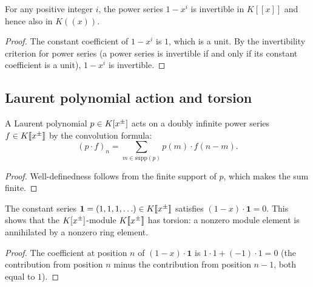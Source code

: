 \begin{lemma}
\label{lem.fps.laure.one-sub-xpow-unit}
\leanhelper
\leanok
For any positive integer $i$, the power series $1 - x^i$ is invertible
in $K\left[\left[x\right]\right]$ and hence also in
$K\left(\left(x\right)\right)$.
\end{lemma}

\begin{proof}
\leanok
The constant coefficient of $1 - x^i$ is $1$, which is a unit.
By the invertibility criterion for power series (a power series is
invertible if and only if its constant coefficient is a unit),
$1 - x^i$ is invertible.
\end{proof}

\subsection{Laurent polynomial action and torsion}

\begin{lemma}
\label{lem.fps.laure.laupol-smul}
\leanhelper
\leanok
A Laurent polynomial $p \in K[x^{\pm}]$ acts on a doubly infinite
power series $f \in K[\![ x^{\pm} ]\!]$ by the
convolution formula:
\[
(p \cdot f)_n = \sum_{m \in \mathrm{supp}(p)} p(m) \cdot f(n - m).
\]
\end{lemma}

\begin{proof}
Well-definedness follows from the finite support of $p$, which
makes the sum finite.
\end{proof}

\begin{lemma}
\label{lem.fps.laure.torsion-example}
\leanhelper
\leanok
The constant series $\mathbf{1} = (1, 1, 1, \ldots) \in K[\![ x^{\pm} ]\!]$
satisfies $(1 - x) \cdot \mathbf{1} = 0$.
This shows that the $K[x^{\pm}]$-module $K[\![ x^{\pm} ]\!]$
has torsion: a nonzero module element is annihilated by a nonzero
ring element.
\end{lemma}

\begin{proof}
The coefficient at position $n$ of $(1 - x) \cdot \mathbf{1}$ is
$1 \cdot 1 + (-1) \cdot 1 = 0$ (the contribution from position $n$
minus the contribution from position $n - 1$, both equal to $1$).
\end{proof}

